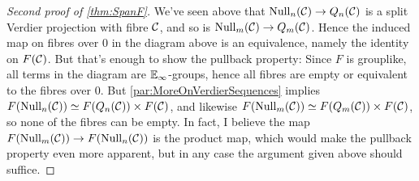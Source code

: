 \documentclass[a4paper, 10pt, oneside, DIV=9, chapterprefix=true, numbers=enddot,bibliography=totoc]{scrbook}
\begin{document}
\begin{proof}[Second proof of \cref{thm:SpanF}]
	We've seen above that $\operatorname{Null}_n(\Cc)\morphism Q_n(\Cc)$ is a split Verdier projection with fibre $\mathcal{C}$, and so is $\operatorname{Null}_m(\Cc)\morphism Q_m(\Cc)$. Hence the induced map on fibres over $0$ in the diagram above is an equivalence, namely the identity on $F(\mathcal{C})$. But that's enough to show the pullback property: Since $F$ is grouplike, all terms in the diagram are $\mathbb{E}_\infty$-groups, hence all fibres are empty or equivalent to the fibres over $0$. But \cref{par:MoreOnVerdierSequences} implies $F(\operatorname{Null}_n(\mathcal{C}))\simeq F(Q_n(\mathcal{C}))\times F(\mathcal{C})$, and likewise $F(\operatorname{Null}_m(\mathcal{C}))\simeq F(Q_m(\mathcal{C}))\times F(\mathcal{C})$, so none of the fibres can be empty. In fact, I believe the map $F(\operatorname{Null}_m(\Cc))\morphism F(\operatorname{Null}_n(\Cc))$ is the product map, which would make the pullback property even more apparent, but in any case the argument given above should suffice.
\end{proof}
\end{document}
